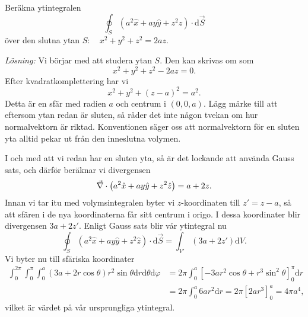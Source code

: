 \documentclass[%
oneside,                 %
final,                   %
10pt]{article}
\newenvironment{notice_mdfboxadmon}[1][]{
\begin{notice_mdfboxmdframed}[frametitle=#1]
}
{
\end{notice_mdfboxmdframed}
}
\begin{document}
\begin{notice_mdfboxadmon}

Beräkna ytintegralen
\begin{equation}
  \oint_S \left(a^2\hat{x} +ay\hat{y} + z^2\hat{z}\right) 
\cdot \mbox{d}\vec{S}
\end{equation}
över den slutna ytan $S:\quad x^2 + y^2 + z^2 = 2az$.

\emph{Lösning:}  
Vi börjar med att studera ytan $S$. Den kan skrivas om som
\begin{equation}
  x^2 + y^2 + z^2 - 2az = 0.
\end{equation}
Efter kvadratkomplettering har vi
\begin{equation}
  x^2 + y^2 + \left(z -a\right)^2 = a^2.
\end{equation}
Detta är en sfär med radien $a$ och centrum i $(0,0,a)$.  Lägg märke till att eftersom ytan redan är sluten, så råder det inte någon tvekan om hur normalvektorn är riktad.  Konventionen säger oss att normalvektorn för en sluten yta alltid pekar ut från den inneslutna volymen.

I och med att vi redan har en sluten yta, så är det lockande att använda Gauss sats, och därför beräknar vi divergensen
\begin{equation}
  \vec{\nabla} \cdot \left(a^2 \hat{x} + ay \hat{y} + z^2 \hat{z}
\right) = a + 2z.
\end{equation}
Innan vi tar itu med volymsintegralen byter vi $z$-koordinaten till $z' = z -a$, så att sfären i de nya koordinaterna får sitt centrum i origo.  I dessa koordinater blir divergensen $3a +2z'$.  Enligt Gauss sats blir vår ytintegral nu
\begin{equation}
  \oint_S \left(a^2\hat{x} + ay \hat{y} + z^2 \hat{z}\right)
\cdot \mbox{d}\vec{S} = \int_{V'} \left(3a + 2z'\right) \mbox{d}V.
\end{equation}
Vi byter nu till sfäriska koordinater
\begin{align}
  \int_0^{2\pi} \int_0^\pi \int_0^a \left(3a + 2r\cos \theta\right) r^2
\sin \theta \mbox{d}r \mbox{d}\theta \mbox{d}\varphi &= 2\pi \int_0^a
\left[-3ar^2 \cos \theta + r^3 \sin^2 \theta \right]_0^\pi \mbox{d}r
\nonumber \\
&= 2\pi \int_0^a 6ar^2 \mbox{d}r = 2 \pi \left[2ar^3\right]_0^a = 4\pi a^4,
\end{align}
vilket är värdet på vår ursprungliga ytintegral.
\end{notice_mdfboxadmon} %





\end{document}
